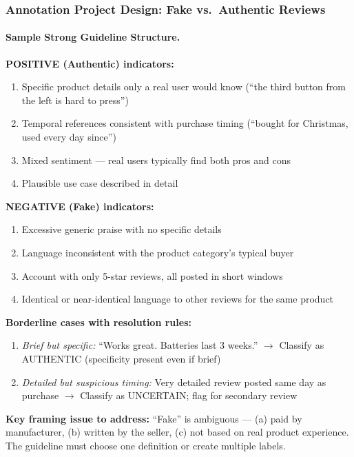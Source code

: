 \subsubsection{Annotation Project Design: Fake vs.\ Authentic Reviews}

\paragraph{Sample Strong Guideline Structure.}

\textbf{POSITIVE (Authentic) indicators:}
\begin{enumerate}
    \item Specific product details only a real user would know (``the third button from the left is hard to press'')
    \item Temporal references consistent with purchase timing (``bought for Christmas, used every day since'')
    \item Mixed sentiment --- real users typically find both pros and cons
    \item Plausible use case described in detail
\end{enumerate}

\textbf{NEGATIVE (Fake) indicators:}
\begin{enumerate}
    \item Excessive generic praise with no specific details
    \item Language inconsistent with the product category's typical buyer
    \item Account with only 5-star reviews, all posted in short windows
    \item Identical or near-identical language to other reviews for the same product
\end{enumerate}

\textbf{Borderline cases with resolution rules:}
\begin{enumerate}
    \item \textit{Brief but specific:} ``Works great. Batteries last 3 weeks.'' $\to$ Classify as AUTHENTIC (specificity present even if brief)
    \item \textit{Detailed but suspicious timing:} Very detailed review posted same day as purchase $\to$ Classify as UNCERTAIN; flag for secondary review
\end{enumerate}

\textbf{Key framing issue to address:} ``Fake'' is ambiguous --- (a) paid by manufacturer, (b) written by the seller, (c) not based on real product experience. The guideline must choose one definition or create multiple labels.

